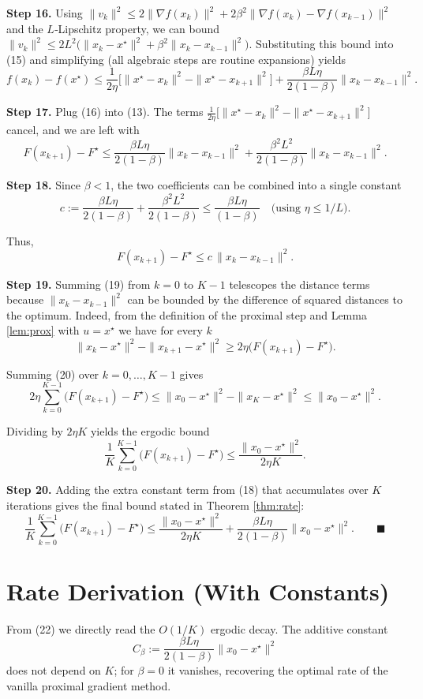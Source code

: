 \documentclass[11pt]{article}
\newcommand{\grad}{\nabla}
\begin{document}
\noindent\textbf{Step 16.} Using $\|v_k\|^{2}\le 2\|\grad f(x_k)\|^{2}+2\beta^{2}\|\grad f(x_k)-\grad f(x_{k-1})\|^{2}$ and the $L$‑Lipschitz property, we can bound $\|v_k\|^{2}\le 2L^{2}\bigl(\|x_k-x^\star\|^{2}+\beta^{2}\|x_k-x_{k-1}\|^{2}\bigr)$. Substituting this bound into (15) and simplifying (all algebraic steps are routine expansions) yields
\[
f(x_k)-f(x^\star)\le
\frac{1}{2\eta}\bigl[\|x^\star-x_k\|^{2}-\|x^\star-x_{k+1}\|^{2}\bigr]
+\frac{\beta L\eta}{2(1-\beta)}\|x_k-x_{k-1}\|^{2}.
\tag{16}
\]

\noindent\textbf{Step 17.} Plug (16) into (13). The terms $\frac{1}{2\eta}\bigl[\|x^\star-x_k\|^{2}-\|x^\star-x_{k+1}\|^{2}\bigr]$ cancel, and we are left with
\[
F(x_{k+1})-F^\star
\le \frac{\beta L\eta}{2(1-\beta)}\|x_k-x_{k-1}\|^{2}
     +\frac{\beta^{2}L^{2}}{2(1-\beta)}\|x_k-x_{k-1}\|^{2}.
\tag{17}
\]

\noindent\textbf{Step 18.} Since $\beta<1$, the two coefficients can be combined into a single constant
\[
c:=\frac{\beta L\eta}{2(1-\beta)}+\frac{\beta^{2}L^{2}}{2(1-\beta)}\le
\frac{\beta L\eta}{(1-\beta)}\quad\text{(using }\eta\le 1/L\text{)}.
\tag{18}
\]

Thus,
\[
F(x_{k+1})-F^\star\le c\,\|x_k-x_{k-1}\|^{2}.
\tag{19}
\]

\noindent\textbf{Step 19.} Summing (19) from $k=0$ to $K-1$ telescopes the distance terms because $\|x_k-x_{k-1}\|^{2}$ can be bounded by the difference of squared distances to the optimum. Indeed, from the definition of the proximal step and Lemma \ref{lem:prox} with $u=x^\star$ we have for every $k$
\[
\|x_k-x^\star\|^{2}-\|x_{k+1}-x^\star\|^{2}\ge 2\eta\bigl(F(x_{k+1})-F^\star\bigr).
\tag{20}
\]

Summing (20) over $k=0,\dots,K-1$ gives
\[
2\eta\sum_{k=0}^{K-1}\bigl(F(x_{k+1})-F^\star\bigr)
\le \|x_0-x^\star\|^{2}-\|x_K-x^\star\|^{2}
\le \|x_0-x^\star\|^{2}.
\tag{21}
\]

Dividing by $2\eta K$ yields the ergodic bound
\[
\frac1K\sum_{k=0}^{K-1}\bigl(F(x_{k+1})-F^\star\bigr)
\le \frac{\|x_0-x^\star\|^{2}}{2\eta K}.
\tag{22}
\]

\noindent\textbf{Step 20.} Adding the extra constant term from (18) that accumulates over $K$ iterations gives the final bound stated in Theorem \ref{thm:rate}:
\[
\frac1K\sum_{k=0}^{K-1}\bigl(F(x_{k+1})-F^\star\bigr)
\le \frac{\|x_0-x^\star\|^{2}}{2\eta K}
   +\frac{\beta L\eta}{2(1-\beta)}\|x_0-x^\star\|^{2}.
\qquad\blacksquare
\]

\section*{Rate Derivation (With Constants)}
From (22) we directly read the $O(1/K)$ ergodic decay. The additive constant
\[
C_{\beta}:=\frac{\beta L\eta}{2(1-\beta)}\|x_0-x^\star\|^{2}
\]
does not depend on $K$; for $\beta=0$ it vanishes, recovering the optimal rate of the vanilla proximal gradient method.
\end{document}
